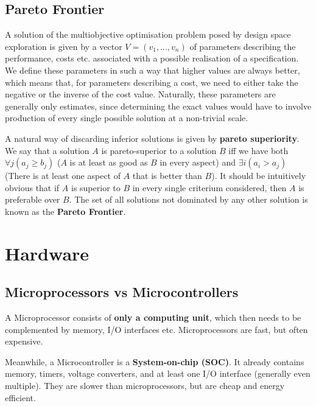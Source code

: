 \documentclass{report}
\newcommand{\tbf}{\textbf}
\newcommand*{\newpar}{\par\vspace{\baselineskip}\noindent} %
\begin{document}
\section{Pareto Frontier}
A solution of the multiobjective optimisation problem posed by design space exploration is given by a vector $V = (v_1, \hdots, v_n)$ of parameters describing the performance, costs etc. associated with a possible realisation of a specification. We define these parameters in such a way that higher values are always better, which means that, for parameters describing a cost, we need to either take the negative or the inverse of the cost value. Naturally, these parameters are generally only estimates, since determining the exact values would have to involve production of every single possible solution at a non-trivial scale.
\newpar
A natural way of discarding inferior solutions is given by \tbf{pareto superiority}. We say that a solution $A$ is pareto-superior to a solution $B$ iff we have both $\forall j(a_j \geq b_j)$ ($A$ is at least as good as $B$ in every aspect) and $\exists i(a_i > a_j)$ (There is at least one aspect of $A$ that is better than $B$). It should be intuitively obvious that if $A$ is superior to $B$ in every single criterium considered, then $A$ is preferable over $B$. The set of all solutions not dominated by any other solution is known as the \tbf{Pareto Frontier}.
%
\chapter{Hardware}
\thispagestyle{fancy}
\section{Microprocessors vs Microcontrollers}
A Microprocessor consists of \tbf{only a computing unit}, which then needs to be complemented by memory, I/O interfaces etc. Microprocessors are fast, but often  expensive.
\newpar
Meanwhile, a Microcontroller is a \tbf{System-on-chip (SOC)}. It already contains memory, timers, voltage converters, and at least one I/O interface (generally even multiple). They are slower than microprocessors, but are cheap and energy efficient.
%
\end{document}
